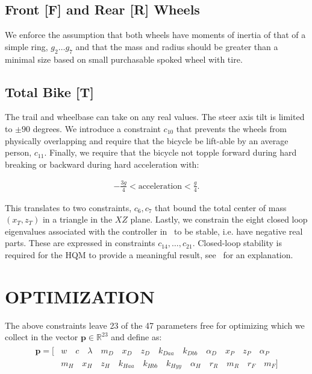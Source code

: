 \documentclass{bmd2019p}
\begin{document}
\subsection{Front [F] and Rear [R] Wheels}
%
We enforce the assumption that both wheels have moments of inertia of that of a
simple ring, $g_2 \ldots g_7$ and that the mass and radius should be greater
than a minimal size based on small purchasable spoked wheel with tire.

\subsection{Total Bike [T]}
%
The trail and wheelbase can take on any real values. The steer axis tilt is
limited to $\pm90$ degrees. We introduce a constraint $c_{10}$ that prevents
the wheels from physically overlapping and require that the bicycle be
lift-able by an average person, $c_{11}$. Finally, we require that the bicycle
not topple forward during hard breaking or backward during hard acceleration
with:

\begin{align}
  -\frac{3g}{4} < \textrm{acceleration} < \frac{g}{4}\textrm{.}
\end{align}

This translates to two constraints, $c_6,c_7$ that bound the total center of
mass $(x_T,z_T)$ in a triangle in the $XZ$ plane. Lastly, we constrain the
eight closed loop eigenvalues associated with the controller in~\cite{Hess2012}
to be stable, i.e. have negative real parts. These are expressed in constraints
$c_{14},\ldots,c_{21}$. Closed-loop stability is required for the HQM to
provide a meaningful result, see~\cite{Hess2012} for an explanation.

\section{OPTIMIZATION}
%
The above constraints leave 23 of the 47 parameters free for optimizing which
we collect in the vector $\mathbf{p}\in\mathbb{R}^{23}$ and define as:
%
\begin{align}
  \begin{split}
    \mathbf{p} = [ &
       w        \quad
       c        \quad
       \lambda  \quad
       m_D      \quad
       x_D      \quad
       z_D      \quad
       k_{Daa}  \quad
       k_{Dbb}  \quad
       \alpha_D \quad
       x_P      \quad
       z_P      \quad
       \alpha_P \\
     & m_H      \quad
       x_H      \quad
       z_H      \quad
       k_{Haa}  \quad
       k_{Hbb}  \quad
       k_{Hyy}  \quad
       \alpha_H \quad
       r_R      \quad
       m_R      \quad
       r_F      \quad
       m_F]
  \end{split}
\end{align}
\end{document}
